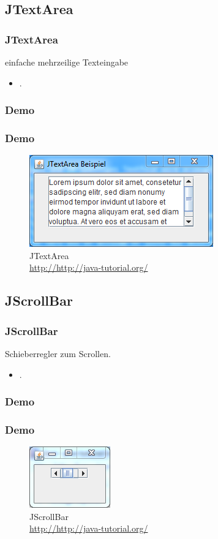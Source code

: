 \documentclass[xcolor=dvipsnames]{beamer}
\begin{document}
\subsection{JTextArea}
\begin{frame} %
  \frametitle{JTextArea
} %
  \begin{block}{einfache mehrzeilige Texteingabe}
	  \begin{itemize}
		\item .
	  \end{itemize}
  \end{block}
\end{frame}

\subsubsection{Demo}
\begin{frame}
  \frametitle{Demo}
	\begin{figure}
		\includegraphics[scale=1.0]{images/jtextarea.PNG}
		\caption{JTextArea \\ \tiny{\textcolor{gray}{\url{http://http://java-tutorial.org/}}}}
		\end{figure}
\end{frame}


\subsection{JScrollBar}
\begin{frame} %
  \frametitle{JScrollBar
} %
  \begin{block}{Schieberregler zum Scrollen.}
	  \begin{itemize}
		\item .
	  \end{itemize}
  \end{block}
\end{frame}


\subsubsection{Demo}
\begin{frame}
  \frametitle{Demo}
	\begin{figure}
		\includegraphics[scale=1.0]{images/jscrollbar.PNG}
		\caption{JScrollBar \\ \tiny{\textcolor{gray}{\url{http://http://java-tutorial.org/}}}}
		\end{figure}
\end{frame}
\end{document}
